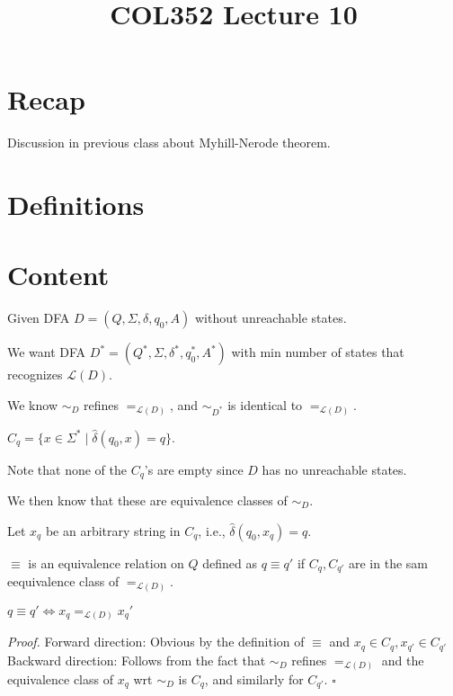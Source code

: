 \documentclass[a4paper]{article}
\title{\textbf{COL352 Lecture 10}}
\date{}
\newenvironment{proof}{\begin{breakbox}\textit{Proof.}}{\hfill$\square$\end{breakbox}}
\newcommand{\nl}{\vspace{0.2cm}\\}
\newcommand{\mc}{\mathcal}
\renewcommand{\L}{\mc{L}}
\newcommand{\hd}{\hat{\delta}}
\begin{document}
\maketitle
\tableofcontents

\section{Recap}

Discussion in previous class about Myhill-Nerode theorem.

\section{Definitions}

\section{Content}

Given DFA $D = (Q, \Sigma, \delta, q_0, A)$ without unreachable states.

We want DFA $D^* = (Q^*, \Sigma, \delta^*, q_0^*, A^*)$ with min number of states that recognizes $\L(D)$.

We know $\sim_D$ refines $=_{\L(D)}$, and $\sim_{D^*}$ is identical to $=_{\L(D)}$.

\begin{defn}
$C_q = \{x \in \Sigma^* \mid \hd(q_0, x) = q\}$.
\end{defn}

Note that none of the $C_q$'s are empty since $D$ has no unreachable states.

We then know that these are equivalence classes of $\sim_D$.

Let $x_q$ be an arbitrary string in $C_q$, i.e., $\hd(q_0, x_q) = q$.

\begin{defn}
    $\equiv$ is an equivalence relation on $Q$ defined as $q \equiv q'$ if $C_q, C_{q'}$ are in the sam eequivalence class of $=_{\L(D)}$.
\end{defn}

\begin{claim}
    $q \equiv q' \iff x_q =_{\L(D)} x_q'$
\end{claim}

\begin{proof}
    Forward direction: Obvious by the definition of $\equiv$ and $x_q \in C_q, x_{q'} \in C_{q'}$\nl
    Backward direction: Follows from the fact that $\sim_D$ refines $=_{\L(D)}$ and the equivalence class of $x_q$ wrt $\sim_D$ is $C_q$, and similarly for $C_{q'}$.
\end{proof}
\end{document}
